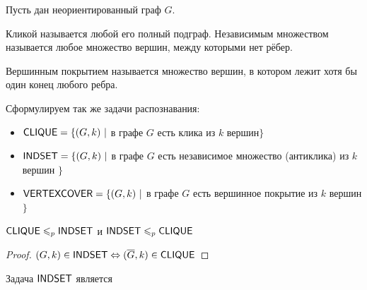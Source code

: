 Пусть дан неориентированный граф $G$.

\begin{definition} Кликой называется любой его полный подграф. Независимым множеством называется любое множество вершин, между которыми нет рёбер.
\end{definition}

\begin{definition} Вершинным покрытием называется множество вершин, в котором лежит хотя бы один конец любого ребра.
\end{definition}


Сформулируем так же задачи распознавания:

\begin{itemize}
    \item $\mathsf{CLIQUE} = \{ (G,k)\ |$ в графе $G$ есть клика из $k$ вершин$\}$
    \item $\mathsf{INDSET} = \{ (G,k)\ |$ в графе $G$ есть независимое множество (антиклика) из $k$ вершин $\}$
    \item $\mathsf{VERTEXCOVER} = \{ (G,k)\ |$ в графе $G$ есть вершинное покрытие из $k$ вершин$\}$
\end{itemize}

\begin{statement} $\mathsf{CLIQUE} \leqslant_p \mathsf{INDSET}$ и $\mathsf{INDSET} \leqslant_p \mathsf{CLIQUE}$
\end{statement}

\begin{proof}
$(G,k) \in \mathsf{INDSET} \Leftrightarrow (\overline{G}, k) \in \mathsf{CLIQUE}$ 
\end{proof}

\begin{theorem}
Задача $\mathsf{INDSET}$ является \npc
\end{theorem}

